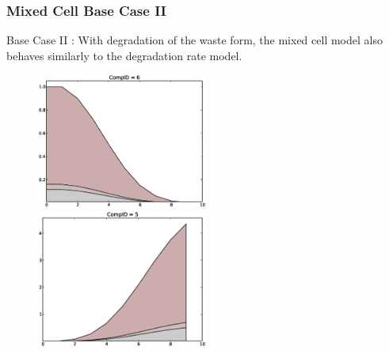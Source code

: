 \begin{frame}
  \frametitle{Mixed Cell Base Case II}
  Base Case II : With degradation of the waste form, the mixed cell model also 
  behaves similarly to the degradation rate model. 

  \begin{figure}[htbp!]
    \begin{center}
     \includegraphics[width=0.5\textwidth]{cyder/images/mixed_comp6.eps}
     \includegraphics[width=0.5\textwidth]{cyder/images/mixed_comp5.eps}
    \end{center}
  \end{figure}
\end{frame}


